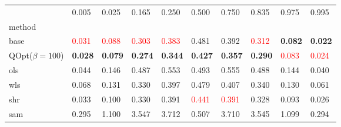 \begin{tabular}{llllllllll}
\toprule
 & 0.005 & 0.025 & 0.165 & 0.250 & 0.500 & 0.750 & 0.835 & 0.975 & 0.995 \\
method &  &  &  &  &  &  &  &  &  \\
\midrule
base & \textcolor{red}{0.031} & \textcolor{red}{0.088} & \textcolor{red}{0.303} & \textcolor{red}{0.383} & 0.481 & 0.392 & \textcolor{red}{0.312} & \textbf{0.082} & \textbf{0.022} \\
\midrule
QOpt($\beta=100$) & \textbf{0.028} & \textbf{0.079} & \textbf{0.274} & \textbf{0.344} & \textbf{0.427} & \textbf{0.357} & \textbf{0.290} & \textcolor{red}{0.083} & \textcolor{red}{0.024} \\
ols & 0.044 & 0.146 & 0.487 & 0.553 & 0.493 & 0.555 & 0.488 & 0.144 & 0.040 \\
wls & 0.068 & 0.131 & 0.330 & 0.397 & 0.479 & 0.407 & 0.340 & 0.130 & 0.061 \\
shr & 0.033 & 0.100 & 0.330 & 0.391 & \textcolor{red}{0.441} & \textcolor{red}{0.391} & 0.328 & 0.093 & 0.026 \\
sam & 0.295 & 1.100 & 3.547 & 3.712 & 0.507 & 3.710 & 3.545 & 1.099 & 0.294 \\
\bottomrule
\end{tabular}